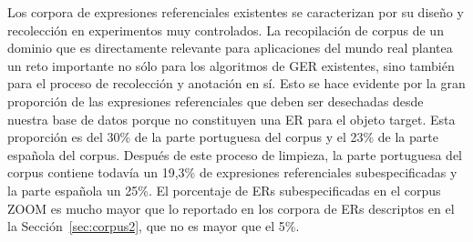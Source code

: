 Los corpora de expresiones referenciales existentes se caracterizan por su dise\~no y recolecci\'on en experimentos muy controlados. La recopilaci\'on de corpus de un dominio que es directamente relevante para aplicaciones del mundo real plantea un reto importante no s\'olo para los algoritmos de GER existentes, sino tambi\'en para el proceso de recolecci\'on y anotaci\'on en s\'{i}. Esto se hace evidente por la gran proporci\'on de las expresiones referenciales que deben ser desechadas desde nuestra base de datos porque no constituyen una ER para el objeto target. Esta proporci\'on es del 30\% de la parte portuguesa del corpus y el 23\% de la parte espa\~nola del corpus.
Despu\'es de este proceso de limpieza, la parte portuguesa del corpus contiene todav\'{i}a un 19,3\% de expresiones referenciales subespecificadas y la parte espa\~nola un 25\%. El porcentaje de ERs subespecificadas en el corpus ZOOM es mucho mayor que lo reportado en los corpora de ERs descriptos en el la Secci\'on~\ref{sec:corpus2}, que no es mayor que el 5\%. 

